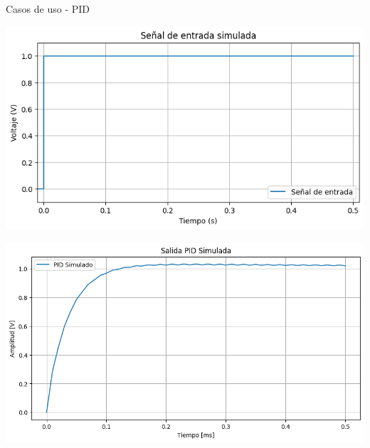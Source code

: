 \documentclass[10pt,aspectratio=169]{beamer} %
\begin{document}
\begin{frame}{Casos de uso - PID}
  \centering
  \begin{minipage}{0.4\linewidth}
    \centering
    \includegraphics[scale=0.2]{PID/entrada_simulada.png}
  \end{minipage}%
  \hfill
  \begin{minipage}{0.4\linewidth}
    \centering
    \includegraphics[scale=0.17]{PID/salida_simulada.png}
  \end{minipage}

  \vspace{0.1cm} %


\end{frame}
\end{document}
